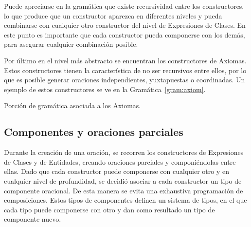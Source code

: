 Puede apreciarse en la gramática que existe recursividad entre los constructores, lo que produce que un constructor aparezca en diferentes niveles y pueda combinarse con cualquier otro constructor del nivel de Expresiones de Clases. En este punto es importante que cada constructor pueda componerse con los demás, para asegurar cualquier combinación posible.


Por último en el nivel más abstracto se encuentran los constructores de Axiomas. Estos constructores tienen la característica de no ser recursivos entre ellos, por lo que es posible generar oraciones independientes, yuxtapuestas o coordinadas. Un ejemplo de estos constructores se ve en la Gramática~\ref{gram:axiom}.

\begin{GrammarEnv}
\begin{grammar}
[(colon){$\rightarrow$}]
[(semicolon)$|$]
[(comma){}]
[(period){\vspace{0.3cm} \\}]
[(quote){\begin{bf}}{\end{bf}}]
[(nonterminal){$<$}{$>$}]
\end{grammar}
\caption{Porción de gramática asociada a los Axiomas.}\label{gram:axiom}
\end{GrammarEnv}

\subsection{Componentes y oraciones parciales}
Durante la creación de una oración, se recorren los constructores de Expresiones de Clases y de Entidades, creando oraciones parciales y componiéndolas entre ellas. Dado que cada constructor puede componerse con cualquier otro y en cualquier nivel de profundidad, se decidió asociar a cada constructor un tipo de componente oracional. De esta manera se evita una exhaustiva programación de composiciones. Estos tipos de componentes definen un sistema de tipos, en el que cada tipo puede componerse con otro y dan como resultado un tipo de componente nuevo. %

